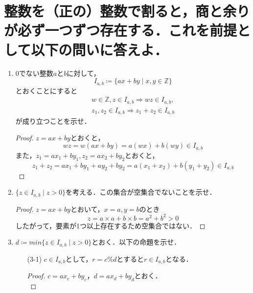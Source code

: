 \documentclass[a4paper,12pt]{ltjsarticle}
\newcommand{\Z}{\mathbb{Z}}
\begin{document}
\section{整数を（正の）整数で割ると，商と余りが必ず一つずつ存在する．これを前提として以下の問いに答えよ．}
\begin{enumerate}[(1)]
    \item 0でない整数$a$と$b$に対して，
        \begin{equation*}
            I_{a,b} \coloneqq \{ ax + by \mid x,y \in \Z \}
        \end{equation*}
        とおくことにすると
        \begin{gather*}
            w \in \Z, z \in I_{a,b} \Rightarrow wz \in I_{a,b}, \\
            z_1, z_2 \in I_{a,b} \Rightarrow z_1 + z_2 \in I_{a,b}
        \end{gather*}
        が成り立つことを示せ．
        \begin{proof}
            $z = ax + by$とおくと，
            \begin{equation*}
                wz = w(ax + by) = a(wx) + b(wy) \in I_{a,b}
            \end{equation*}
            また，$z_1 = ax_1 + by_1, z_2 = ax_2 + by_2$とおくと，
            \begin{equation*}
                z_1 + z_2 = ax_1 + by_1 + ay_2 + by_2 = a(x_1 + x_2) + b(y_1 + y_2) \in I_{a,b}
            \end{equation*}
        \end{proof}
    \item $\{ z \in I_{a,b} \mid z > 0 \}$を考える．この集合が空集合でないことを示せ．
        \begin{proof}
            $z = ax + by$とおいて，$x = a, y = b$のとき
            \begin{equation*}
                z = a \times a + b \times b = a^2 + b^2 > 0
            \end{equation*}
            したがって，要素が1つ以上存在するため空集合ではない．
        \end{proof}
    \item $d \coloneqq min\{ z \in I_{a,b} \mid z > 0 \}$とおく．以下の命題を示せ．
        \begin{enumerate}
            \item[(3-1)] $c \in I_{a,b}$として，$r = c \% d$とすると$r \in I_{a,b}$となる．
                \begin{proof}
                    $c = ax_c + by_c$，$d = ax_d + by_d$とおく． \\

\end{proof}
\end{enumerate}
\end{enumerate}
\end{document}
